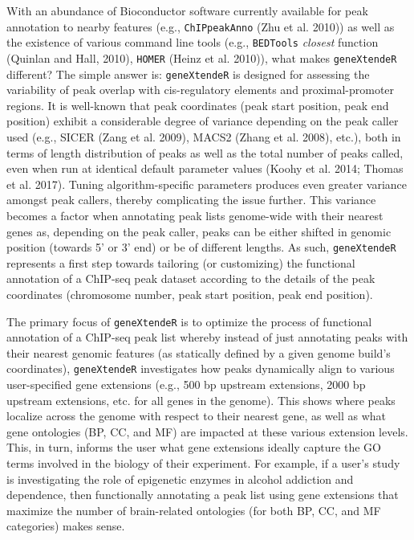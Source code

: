 \documentclass[12pt]{article}
\begin{document}
With an abundance of Bioconductor software currently available for peak annotation to nearby features (e.g., \texttt{ChIPpeakAnno} (Zhu et al. 2010)) as well as the existence of various command line tools (e.g., \texttt{BEDTools} \emph{closest} function (Quinlan and Hall, 2010), \texttt{HOMER} (Heinz et al. 2010)), what makes \texttt{geneXtendeR} different?  The simple answer is: \texttt{geneXtendeR} is designed for assessing the variability of peak overlap with cis-regulatory elements and proximal-promoter regions.  It is well-known that peak coordinates (peak start position, peak end position) exhibit a considerable degree of variance depending on the peak caller used (e.g., SICER (Zang et al. 2009), MACS2 (Zhang et al. 2008), etc.), both in terms of length distribution of peaks as well as the total number of peaks called, even when run at identical default parameter values (Koohy et al. 2014; Thomas et al. 2017).  Tuning algorithm-specific parameters produces even greater variance amongst peak callers, thereby complicating the issue further.  This variance becomes a factor when annotating peak lists genome-wide with their nearest genes as, depending on the peak caller, peaks can be either shifted in genomic position (towards 5' or 3' end) or be of different lengths.  As such, \texttt{geneXtendeR} represents a first step towards tailoring (or customizing) the functional annotation of a ChIP-seq peak dataset according to the details of the peak coordinates (chromosome number, peak start position, peak end position).  

The primary focus of \texttt{geneXtendeR} is to optimize the process of functional annotation of a ChIP-seq peak list whereby instead of just annotating peaks with their nearest genomic features (as statically defined by a given genome build's coordinates), \texttt{geneXtendeR} investigates how peaks dynamically align to various user-specified gene extensions (e.g., 500 bp upstream extensions, 2000 bp upstream extensions, etc. for all genes in the genome).  This shows where peaks localize across the genome with respect to their nearest gene, as well as what gene ontologies (BP, CC, and MF) are impacted at these various extension levels.  This, in turn, informs the user what gene extensions ideally capture the GO terms involved in the biology of their experiment.  For example, if a user's study is investigating the role of epigenetic enzymes in alcohol addiction and dependence, then functionally annotating a peak list using gene extensions that maximize the number of brain-related ontologies (for both BP, CC, and MF categories) makes sense.
\end{document}
